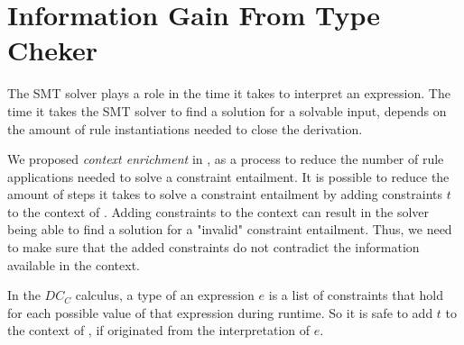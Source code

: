 \section{Information Gain From Type Cheker}
The SMT solver plays a role in the time it takes
to interpret an expression.
The time it takes the SMT solver to find a
solution for a solvable input, depends on the amount
of rule instantiations needed to close the derivation.

We proposed \textit{context enrichment} in ,
as a process to reduce the number of rule applications needed
to solve a constraint entailment.
It is possible to reduce the amount of steps it takes
to solve a constraint entailment 
by adding constraints $t$ to the context of .
Adding constraints to the context
can result in the solver being able to find a solution for
a "invalid" constraint entailment.
Thus, we need to make sure that the added constraints
do not contradict the information available in the context.

In the $DC_C$ calculus, a type of an expression $e$ is a list of constraints that
hold for each possible value of that expression during runtime.
So it is safe to add $t$ to the context of ,
if  originated from the interpretation of $e$.
%

